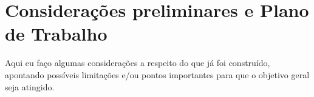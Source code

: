 \chapter{Considerações preliminares e Plano de Trabalho}
\label{cap:plano-de-trabalho}

Aqui eu faço algumas considerações a respeito do que já foi construído, apontando
possíveis limitações e/ou pontos importantes para que o objetivo geral seja atingido.

